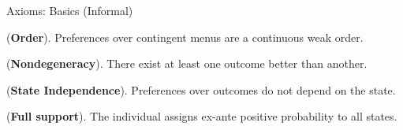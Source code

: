 \documentclass[usenames,dvipsnames,aspectratio=169,11pt,handout]{beamer}
\begin{document}
\begin{frame}{Axioms: Basics (Informal)}\label{axiomsb1main}

	\begin{axiom}\label{ax:order}
		 (\textbf{Order}). Preferences over contingent menus are a continuous weak order. \hyperlink{axiomsb1}{}
	\end{axiom}

	\begin{axiom}\label{ax:degeneracy}

		(\textbf{Nondegeneracy}). There exist at least one outcome better than another. \hyperlink{axiomsb2}{}

	\end{axiom}

	\begin{axiom}\label{ax:sindependence}

		(\textbf{\textbf{State Independence}}). Preferences over outcomes do not depend on the state.
	\end{axiom}

	\begin{axiom}\label{ax:support}

		(\textbf{\textbf{Full support}}). The individual assigns ex-ante positive probability to all states.
	\end{axiom}

	\begin{flushright}
		\hyperlink{mainresult}{}
	\end{flushright}

\end{frame}
\end{document}
